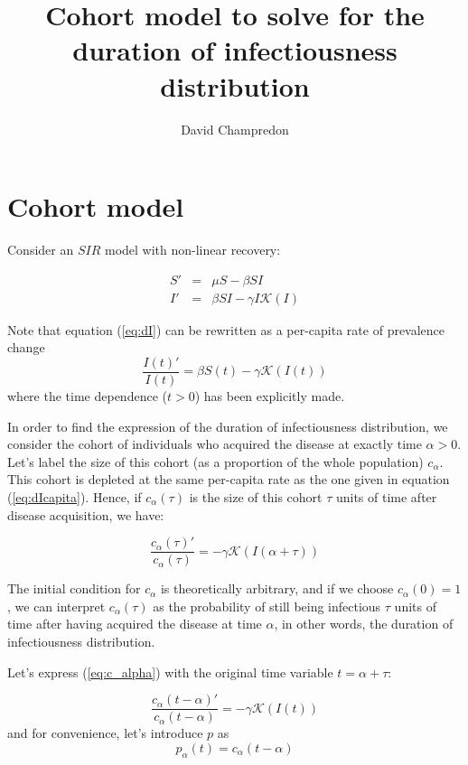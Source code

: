 \documentclass[12pt, twocolumn]{article}   	%
\title{Cohort model to solve for the duration of infectiousness distribution }
\author{David Champredon}
\newcommand{\K}{\mathcal{K}}
\newcommand{\eqref}[1]{(\ref{#1})}
\begin{document}
\maketitle

\section{Cohort model}

Consider an $SIR$ model with non-linear recovery:

\begin{eqnarray}
S' & = & \mu S - \beta SI \\
I' & = & \beta S I - \gamma I \K(I) \label{eq:dI}
\end{eqnarray}

Note that equation \eqref{eq:dI} can be rewritten as a per-capita rate of prevalence change
\begin{equation}
\frac{I(t)'}{I(t)}  =  \beta S(t)  - \gamma \K(I(t)) \label{eq:dIcapita}
\end{equation}
where the time dependence ($t>0$) has been explicitly made.

In order to find the expression of the duration of infectiousness distribution, we consider the cohort of individuals who acquired the disease at exactly time $\alpha>0$. Let's label the size of this cohort (as a proportion of the whole population) $c_\alpha$. This cohort is depleted at the same per-capita rate as the one given in equation \eqref{eq:dIcapita}. Hence, if $c_\alpha(\tau)$ is the size of this cohort $\tau$ units of time after disease acquisition, we have:

\begin{equation}
\frac{c_\alpha(\tau)'}{c_\alpha(\tau)}  =   - \gamma \K(I(\alpha+\tau)) \label{eq:c_alpha}
\end{equation}

The initial condition for $c_\alpha$ is theoretically arbitrary, and if we choose $c_\alpha(0)=1$, we can interpret $c_\alpha(\tau)$ as the probability of still being infectious $\tau$ units of time after having acquired the disease at time $\alpha$, in other words, the duration of infectiousness distribution.

Let's express \eqref{eq:c_alpha} with the original time variable $t = \alpha+\tau$:

\begin{equation}
\frac{c_\alpha(t-\alpha)'}{c_\alpha(t-\alpha)}  =   - \gamma \K(I(t)) \label{eq:c_alpha_t}
\end{equation}
and for convenience, let's introduce $p$ as
$$p_\alpha(t) = c_\alpha(t-\alpha)$$
\end{document}
